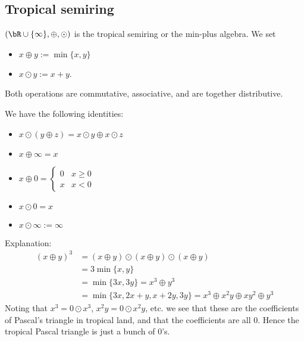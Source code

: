 \subsection{Tropical semiring}
\begin{defn}\label{defn:tropical-semiring}
  $(\bR\cup \{\infty\}, \oplus, \odot)$ is the tropical semiring or the min-plus algebra. We set
  \begin{itemize}
    \item $x \oplus y := \min\{x,y\}$
    \item $x\odot y := x + y$.
  \end{itemize}
  Both operations are commutative, associative, and are together distributive.
\end{defn}
We have the following identities:
\begin{itemize}
  \item $x \odot (y\oplus z) = x\odot y \oplus x\odot z$
  \item $x \oplus \infty = x$
  \item $x \oplus 0 = \begin{cases}0 & x \geq 0 \\ x & x< 0\end{cases}$
  \item $x \odot 0 = x$
  \item $x \odot \infty := \infty$
\end{itemize}

Explanation:
\begin{align*}
  (x\oplus y)^3 &= (x \oplus y) \odot (x \oplus y) \odot (x \oplus y) \\
                &= 3 \min\{x,y\} \\
                &= \min\{3x,3y\} = x^3 \oplus y^3 \\
                &= \min\{3x,2x+y,x+2y,3y\} = x^3 \oplus x^2y \oplus xy^2 \oplus y^3
\end{align*}
Noting that $x^3 = 0\odot x^3$, $x^2y = 0\odot x^2y$, etc. we see that these are the coefficients of Pascal's triangle in tropical land, and that the coefficients are all 0. Hence the tropical Pascal triangle is just a bunch of 0's.

